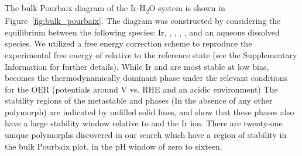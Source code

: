 %
%
The bulk Pourbaix diagram of the Ir-H\textsubscript{2}O system is shown in Figure~\ref{fig:bulk_pourbaix}.
%
The diagram was constructed by considering the equilibrium between the following species: Ir, \rIrOtwo, \aIrOthree, \rIrOthree, \bIrOthree, and an aqueous dissolved  species.
%
We utilized a free energy correction scheme to reproduce the experimental free energy of \IrOtwo relative to the  reference state
(see the Supplementary Information for further details).
%
While Ir and \rIrOtwo are most stable at low bias, \aIrOthree becomes the thermodynamically dominant phase under the relevant conditions for the OER (potentials around  V vs. RHE and an acidic environment)
%
The stability regions of the metastable \rIrOthree and \bIrOthree phases (In the absence of any other \IrOthree polymorph) are indicated by unfilled solid lines, and show that these phases also have a large stability window relative to \IrOtwo and the Ir ion.
%
There are twenty-one unique \IrOthree polymorphs discovered in our search which have a region of stability in the bulk Pourbaix plot, in the pH window of zero to sixteen.
%


